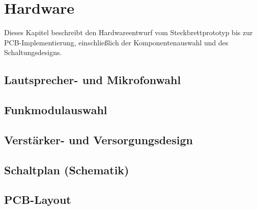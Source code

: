\section{Hardware}

Dieses Kapitel beschreibt den Hardwareentwurf vom Steckbrettprototyp bis zur PCB-Implementierung, einschließlich der Komponentenauswahl und des Schaltungsdesigns.

\subsection{Lautsprecher- und Mikrofonwahl}

\subsection{Funkmodulauswahl}

\subsection{Verstärker- und Versorgungsdesign}


\subsection{Schaltplan (Schematik)}

\subsection{PCB-Layout}
